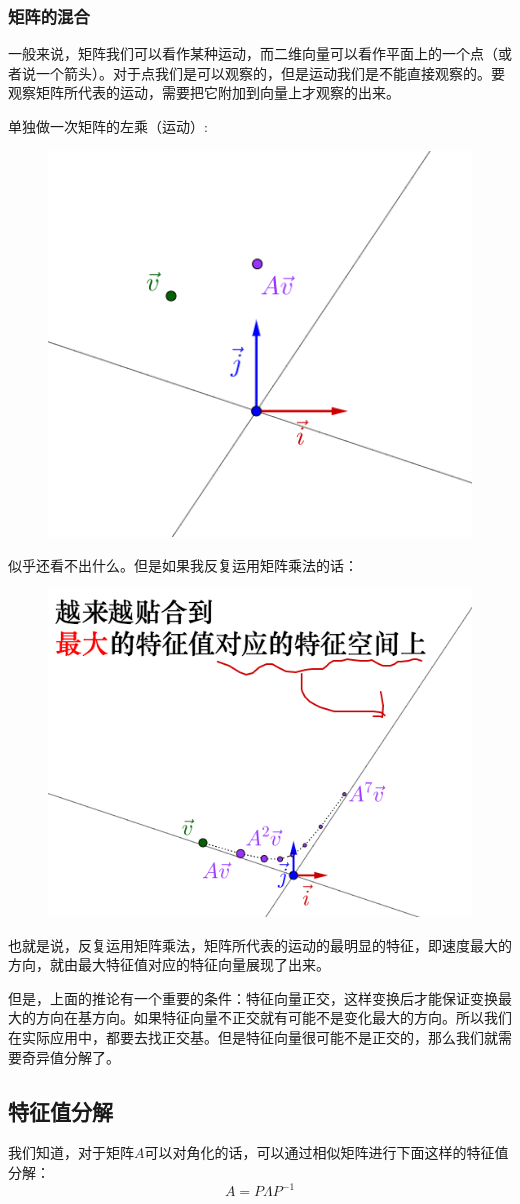 \documentclass[12pt]{article}
\begin{document}
\subsubsection{矩阵的混合}
一般来说，矩阵我们可以看作某种运动，而二维向量可以看作平面上的一个点（或者说一个箭头）。对于点我们是可以观察的，但是运动我们是不能直接观察的。要观察矩阵所代表的运动，需要把它附加到向量上才观察的出来。

单独做一次矩阵的左乘（运动）:
\begin{figure}[H]
    \centering
    \includegraphics[width=.3\textwidth]{fig/UnderstandEigenValueVector_7.png}
\end{figure} 

似乎还看不出什么。但是如果我反复运用矩阵乘法的话：
\begin{figure}[H]
    \centering
    \includegraphics[width=.5\textwidth]{fig/UnderstandEigenValueVector_8.png}
\end{figure} 

也就是说，反复运用矩阵乘法，矩阵所代表的运动的最明显的特征，即速度最大的方向，就由最大特征值对应的特征向量展现了出来。

但是，上面的推论有一个重要的条件：特征向量正交，这样变换后才能保证变换最大的方向在基方向。如果特征向量不正交就有可能不是变化最大的方向。所以我们在实际应用中，都要去找正交基。但是特征向量很可能不是正交的，那么我们就需要奇异值分解了。

\subsection{特征值分解}
我们知道，对于矩阵$A$可以对角化的话，可以通过相似矩阵进行下面这样的特征值分解：
$$
A = P\Lambda P^{-1}
$$
\end{document}
